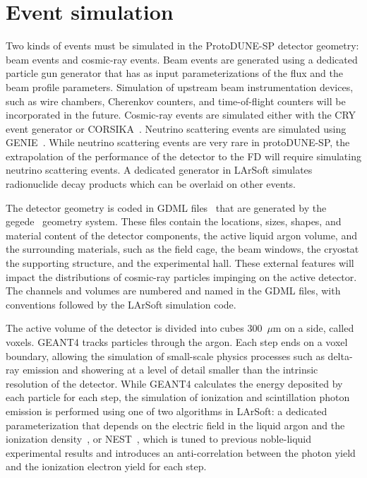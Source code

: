 \section{Event simulation}
\label{sec:larsoftsim}

Two kinds of events must be simulated in the ProtoDUNE-SP detector
geometry: beam events and cosmic-ray events.  Beam events are
generated using a dedicated particle gun generator that has as input
parameterizations of the flux and the beam profile parameters.
Simulation of upstream beam instrumentation devices, such as wire chambers,
Cherenkov counters, and time-of-flight counters will be incorporated in the future. 
 Cosmic-ray
events are simulated either with the CRY~\cite{cry} event generator or
CORSIKA~\cite{corsika}.  Neutrino scattering events are simulated
using GENIE~\cite{genie}.  While neutrino scattering events are very
rare in protoDUNE-SP, the extrapolation of the performance of
the detector to the FD will require simulating neutrino scattering
events.  A dedicated generator in LArSoft simulates
radionuclide decay products which can be overlaid on other events.

The detector geometry is coded in GDML files~\cite{geant4} that are
generated by the gegede~\cite{gegede} 
geometry system.  These files
contain the locations, sizes, shapes, and material content of the
detector components, the active liquid argon volume, and the
surrounding materials, such as the field cage, the beam windows, the
cryostat the supporting structure, and the experimental hall.  These
external features will impact the distributions of cosmic-ray
particles impinging on the active detector.  The channels and volumes
are numbered and named in the GDML files, with conventions followed by
the LArSoft simulation code.

The active volume of the detector is divided into cubes 300~$\mu$m on
a side, called voxels.  GEANT4 tracks particles through the argon.
Each step ends on a voxel boundary, allowing the simulation of small-scale
physics processes such as delta-ray emission and showering at a level
of detail smaller than the intrinsic resolution of the detector.   While GEANT4
calculates the energy deposited by each particle for each step, the
simulation of ionization and scintillation photon emission 
is performed using one of two algorithms in LArSoft:  a dedicated parameterization that
depends on the electric field in the liquid argon and the ionization
density~\cite{birks}, or  NEST~\cite{nest}, which is tuned to
previous noble-liquid experimental results and introduces an
anti-correlation between the photon yield and the ionization electron
yield for each step.  

